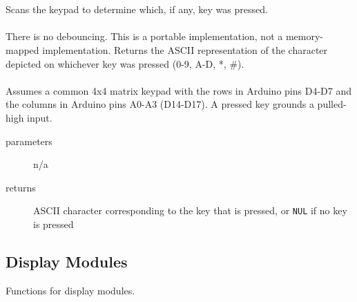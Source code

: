         \begin{itemize}
             \\ \\
            Scans the keypad to determine which, if any, key was pressed. \\ \\
            There is no debouncing.
            This is a portable implementation, not a memory-mapped implementation.
            Returns the ASCII representation of the character depicted on whichever key was pressed (0-9, A-D, *, \#). \\ \\
            Assumes a common 4x4 matrix keypad with the rows in Arduino pins D4-D7 and the columns in Arduino pins A0-A3 (D14-D17).
            A pressed key grounds a pulled-high input.
            \begin{description}
                \item[parameters] n/a
                \item[returns] ASCII character corresponding to the key that is pressed, or \texttt{NUL} if no key is pressed
            \end{description}

        \end{itemize}


    \subsection{Display Modules}\label{subsec:DisplayModules}

    Functions for display modules.

